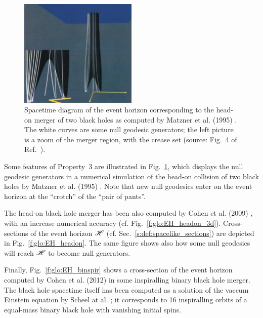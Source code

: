 \begin{figure}
\centerline{\includegraphics[width=0.5\textwidth]{glo_BH_headon_gener.jpg}}
\caption[]{\label{f:glo:BH_headon_gener} \footnotesize
Spacetime diagram of the event horizon corresponding to the head-on merger of
two black holes as computed by Matzner et al. (1995) \cite{Matzn_al95}. The
white curves are some null geodesic generators; the left picture is a zoom of
the merger region, with the crease set
(source: Fig.~4 of Ref.~\cite{Matzn_al95}).}
\end{figure}



Some features of Property~3 are illustrated in Fig.~\ref{f:glo:BH_headon_gener},
which displays the null geodesic generators in a numerical simulation
of the head-on collision of two black holes by Matzner et al. (1995) \cite{Matzn_al95}.
Note that new null geodesics enter on the event horizon at the ``crotch'' of the
``pair of pants''.

The head-on black hole merger has been also computed by Cohen et al. (2009) \cite{CohenPS09}, with an increase numerical accuracy (cf. Fig.~\ref{f:glo:EH_headon_3d}).
Cross-sections of the event horizon $\mathscr{H}$ (cf. Sec.~\ref{s:def:spacelike_sections})
are depicted in Fig.~\ref{f:glo:EH_headon}. The same figure shows also how
some null geodesics will reach $\mathscr{H}$ to become null generators.

Finally, Fig.~\ref{f:glo:EH_binspir} shows a cross-section
of the event horizon computed by Cohen et al. (2012) \cite{CohenKS12}
in some inspiralling binary black hole merger. The
black hole spacetime itself has been computed as a solution of the vaccum
Einstein equation by Scheel at al. \cite{ScheeBCKMP09}; it corresponds to
16 inspiralling orbits of a equal-mass binary black hole with vanishing initial
spins.


